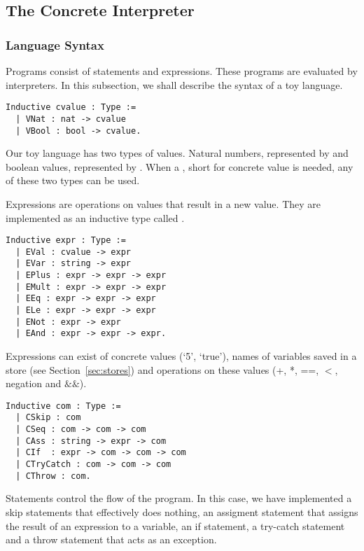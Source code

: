 \subsection{The Concrete Interpreter}

\subsubsection{Language Syntax}\label{sec:lang}
Programs consist of statements and expressions. These programs are evaluated by
interpreters. In this subsection, we shall describe the syntax of a toy
language.


\begin{verbatim}
Inductive cvalue : Type :=
  | VNat : nat -> cvalue
  | VBool : bool -> cvalue.
\end{verbatim}

Our toy language has two types of values. Natural numbers, represented by
 and boolean values, represented by . 
When a , short for concrete value is needed, any of these two 
types can be used.

Expressions are operations on values that result in a new value. They are
implemented as an inductive type called . 

\begin{verbatim}
Inductive expr : Type :=
  | EVal : cvalue -> expr
  | EVar : string -> expr
  | EPlus : expr -> expr -> expr
  | EMult : expr -> expr -> expr
  | EEq : expr -> expr -> expr
  | ELe : expr -> expr -> expr
  | ENot : expr -> expr
  | EAnd : expr -> expr -> expr.
\end{verbatim}

Expressions can exist of concrete values (`5', `true'), names of variables
saved in a store (see Section~\ref{sec:stores}) and operations on these values
(+, *, ==, $<$, negation and $\&\&$). 

\begin{verbatim}
Inductive com : Type :=
  | CSkip : com
  | CSeq : com -> com -> com
  | CAss : string -> expr -> com
  | CIf  : expr -> com -> com -> com
  | CTryCatch : com -> com -> com
  | CThrow : com. 
\end{verbatim}

Statements control the flow of the program. In this case, we have implemented a
skip statements that effectively does nothing, an assigment statement that
assigns the result of an expression to a variable, an if statement, a try-catch
statement and a throw statement that acts as an exception.

